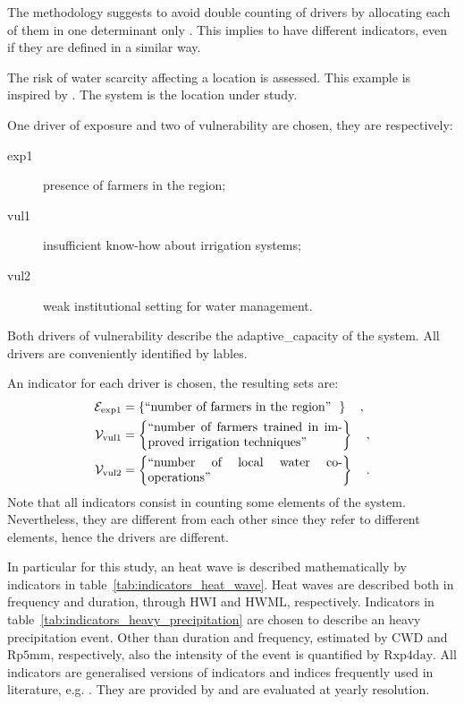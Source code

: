 The methodology suggests to avoid double counting of \glspl{driver} by allocating each of them in one \gls{determinant} only \cite[29]{2017GIZRiskSupplement}. This implies to have different \glspl{indicator}, even if they are defined in a similar way.
\begin{example}
  The risk of water scarcity affecting a location is assessed. This example is inspired by \cite[46]{2017GIZRiskSupplement}. The system is the location under study.
  
  One \gls{driver} of \gls{exposure} and two of \gls{vulnerability} are chosen, they are respectively:
  \begin{description}
    \item[exp1] presence of farmers in the region;
    \item[vul1] insufficient know-how about irrigation systems;
    \item[vul2] weak institutional setting for water management.
  \end{description}
  Both \glspl{driver} of \gls{vulnerability} describe the \gls{adaptive_capacity} of the system. All \glspl{driver} are conveniently identified by lables.
  
  An \gls{indicator} for each \gls{driver} is chosen, the resulting sets are:
  \begin{align*}
    \mathcal{E}_\text{exp1} & = \left\{ \parbox{0.45\linewidth}{``number of farmers in the region''} \right\}
    \quad , \\
    \mathcal{V}_\text{vul1} & = \left\{ \parbox{0.45\linewidth}{``number of farmers trained in improved irrigation techniques''} \right\}
    \quad , \\
    \mathcal{V}_\text{vul2} & = \left\{ \parbox{0.45\linewidth}{``number of local water co-operations''} \right\}
    \quad .
  \end{align*}
  Note that all \glspl{indicator} consist in counting some elements of the system. Nevertheless, they are different from each other since they refer to different elements, hence the drivers are different.
\end{example}

In particular for this study, an heat wave is described mathematically by \glspl{indicator} in table~\ref{tab:indicators_heat_wave}. Heat waves are described both in frequency and duration, through $\mathrm{HWI}$ and $\mathrm{HWML}$, respectively.
Indicators in table~\ref{tab:indicators_heavy_precipitation} are chosen to describe an heavy precipitation event. Other than duration and frequency, estimated by $\mathrm{CWD}$ and $\mathrm{Rp5mm}$, respectively, also the intensity of the event is quantified by $\mathrm{Rxp4day}$.
All indicators are generalised versions of indicators and indices frequently used in literature, e.g. \cite[2208]{2021GutierrezAnnexVI}. They are provided by \cite{2023BourgaultXclimXarray-based} and are evaluated at yearly resolution.

